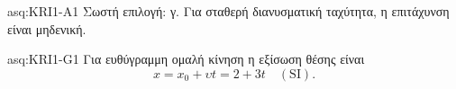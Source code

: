 \clearpage
\thispagestyle{plain}
{}
%
\gdef\BookRunningChapterNumber{}%
\begin{AssessmentSolution}{asq:KRI1-A1}
Σωστή επιλογή: γ. Για σταθερή διανυσματική ταχύτητα, η επιτάχυνση
είναι μηδενική.
\end{AssessmentSolution}
\begin{AssessmentSolution}{asq:KRI1-G1}
Για ευθύγραμμη ομαλή κίνηση η εξίσωση θέσης είναι
\[
  x=x_0+\upsilon t=2+3t\quad (\mathrm{SI}).
\]
\end{AssessmentSolution}
